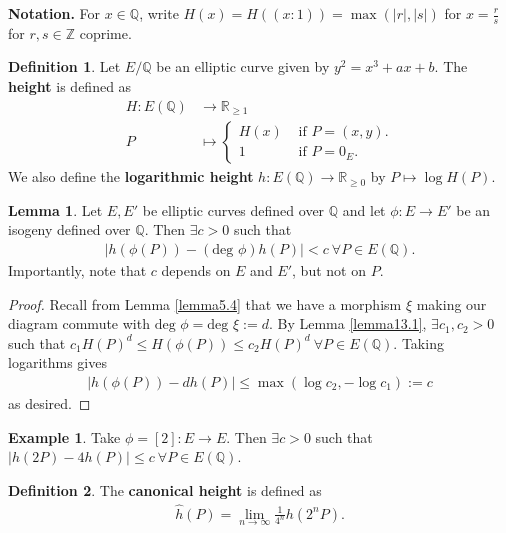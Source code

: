 \documentclass{article}
\theoremstyle{definition}
\newtheorem{lemma}[theorem]{Lemma}
\newtheorem{example}{Example}[section]
\newtheorem{defn}{Definition}[section]
\begin{document}
\textbf{Notation.} For $x \in \mathbb{Q}$, write $H(x)=H((x:1)) = \max(\left|r\right|,\left|s\right|)$ for $x=\frac{r}{s}$ for $r,s \in \mathbb{Z}$ coprime. 
\begin{defn}
    Let $E/\mathbb{Q}$ be an elliptic curve given by $y^2=x^3+ax+b$. The \textbf{height} is defined as 
    \begin{align*}
        H:E(\mathbb{Q}) &\to \mathbb{R}_{\ge 1}\\
        P &\mapsto \begin{cases}
            H(x) &\text{ if } P = (x,y).\\
            1 &\text{ if } P = 0_E.
        \end{cases}
    \end{align*}
    We also define the \textbf{logarithmic height} $h: E(\mathbb{Q}) \to \mathbb{R}_{\ge 0}$ by $P \mapsto \log H(P)$.
\end{defn}
\begin{lemma}\label{lemma13.2}
    Let $E,E'$ be elliptic curves defined over $\mathbb{Q}$ and let $\phi: E \to E'$ be an isogeny defined over $\mathbb{Q}$. Then $\exists c>0$ such that
    \begin{align*}
        \left|h(\phi(P))-(\text{deg }\phi)h(P)\right| < c ~\forall P \in E(\mathbb{Q}).
    \end{align*}
    Importantly, note that $c$ depends on $E$ and $E'$, but not on $P$.
\end{lemma}
\begin{proof}
    Recall from Lemma \ref{lemma5.4} that we have a morphism $\xi$ making our diagram commute with $\text{deg }\phi = \text{deg }\xi := d$. By Lemma \ref{lemma13.1}, $\exists c_1,c_2>0$ such that $c_1H(P)^d \le H(\phi(P)) \le c_2 H(P)^d ~\forall P \in E(\mathbb{Q})$. Taking logarithms gives 
    \begin{align*}
        \left|h(\phi(P))-d h(P)\right| \le \max(\log c_2, - \log c_1) := c
    \end{align*}
    as desired.
\end{proof}
\begin{example}
    Take $\phi = [2] : E \to E$. Then $\exists c>0$ such that $\left|h(2P)-4h(P)\right|\le c ~\forall P \in E(\mathbb{Q})$.
\end{example}
\begin{defn}
    The \textbf{canonical height} is defined as 
    \begin{align*}
        \widehat{h}(P) = \lim_{n \to \infty} \frac{1}{4^n} h(2^n P).
    \end{align*}
\end{defn}
\end{document}
